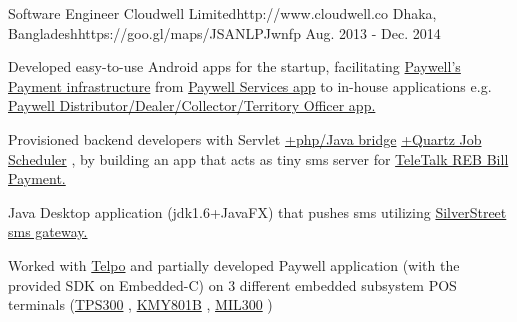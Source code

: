 \begin{workentries}
\workentry
{Software Engineer} %
{Cloudwell Limited}{http://www.cloudwell.co} %
{Dhaka, Bangladesh}{https://goo.gl/maps/JSANLPJwnfp} %
{Aug. 2013 - Dec. 2014} %
    {
      \begin{workitems} %
        \item {Developed easy-to-use Android apps for the startup, facilitating 
        {\href{https://www.paywellonline.com/web_paywell/index.php}{Paywell's Payment infrastructure}} 
        from 
        {\href{https://www.youtube.com/channel/UCf_R7aYkzyn_CGZw4xgkNEA}{Paywell Services app}}
        to in-house applications e.g.
        {\href{https://futurestartup.com/2018/03/13/the-evolution-of-cloudwell-clouldwells-strategy-and-ambition-an-interview-with-anisul-islam-founder-and-ceo-cloudwell/}
        {Paywell Distributor/Dealer/Collector/Territory Officer app.}}
        }
        \item {Provisioned backend developers with Servlet
        {\href{http://php-java-bridge.sourceforge.net/pjb/servlet-programming.php}{+php/Java bridge}}
        {\href{http://www.quartz-scheduler.org}{+Quartz Job Scheduler}}
        , by building an app that acts as tiny sms server for 
        {\href{http://www.teletalk.com.bd/dynamicLayout.jsp?page=40002&menuItem=7006}{TeleTalk REB Bill Payment.}}
        \item Java Desktop application (jdk1.6+JavaFX) that pushes sms utilizing 
        {\href{https://www.silverstreet.com}{SilverStreet sms gateway.}}
        }
        \item {Worked with 
        {\href{http://www.telpo.com.cn}{Telpo}}
        and partially developed Paywell application (with the provided SDK on Embedded-C) on 3 different embedded subsystem POS terminals 
        ({\href{https://www.alibaba.com/product-detail/-Telpo-TPS300-EFT-pos-GPRS_576805259.html}{TPS300}}
         , {\href{https://kmychina.en.made-in-china.com/product/xeyJnSQWglcs/China-GPRS-POS-with-PCI-Pinpad-KMY801B-.html}{KMY801B}}
         , {\href{http://movotek.com/products/pos-terminal-mil300/}{MIL300}}         
        )
        }
      \end{workitems}
    }


\end{workentries}
